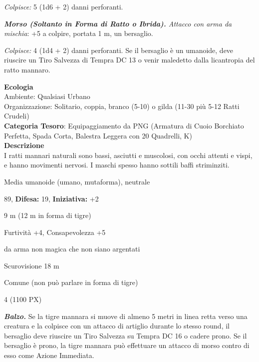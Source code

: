 \begin{multicols}{2}
{\emph{Colpisce:} 5 (1d6 + 2) danni perforanti.

\emph{\textbf{Morso (Soltanto in Forma di Ratto o Ibrida).} Attacco con arma da mischia}: +5 a colpire, portata 1 m, un bersaglio.

\emph{Colpisce:} 4 (1d4 + 2) danni perforanti. Se il bersaglio è un umanoide, deve riuscire un Tiro Salvezza di Tempra DC 13 o venir maledetto dalla licantropia del ratto mannaro.

\textbf{Ecologia}\\
Ambiente: Qualsiasi Urbano\\
Organizzazione: Solitario, coppia, branco (5-10) o gilda (11-30 più 5-12 Ratti Crudeli)\\
\textbf{Categoria Tesoro}: Equipaggiamento da PNG (Armatura di Cuoio Borchiato Perfetta, Spada Corta, Balestra Leggera con 20 Quadrelli, K)\\
\textbf{Descrizione}\\
I ratti mannari naturali sono bassi, asciutti e muscolosi, con occhi attenti e vispi, e hanno movimenti nervosi. I maschi spesso hanno sottili baffi striminziti.

\noindent
\begin{description}[noitemsep, topsep=0pt, parsep=0pt, partopsep=0pt, leftmargin=0cm, labelwidth=2.2cm]
	\item[\textbf{Taglia/Tipo:}] Media umanoide (umano, mutaforma), neutrale
	\item[\textbf{Caratt.:}] 
	\item[\textbf{Punti Ferita:}] 89,  \textbf{Difesa:} 19,  \textbf{Iniziativa:} +2
	\item[\textbf{Movimento:}] 9 m (12 m in forma di tigre)
	\item[\textbf{Tiri Salvez.:}] 
	\item[\textbf{Comp.:}] Furtività +4, Consapevolezza +5
	\item[\textbf{Imm. Danni:}] da arma non magica che non siano argentati
	\item[\textbf{Sensi:}] Scurovisione 18 m
	\item[\textbf{Linguaggi:}] Comune (non può parlare in forma di tigre)
	\item[\textbf{Sfida:}] 4 (1100 PX)\smallskip
\end{description}

\emph{\textbf{Balzo.}} Se la tigre mannara si muove di almeno 5 metri in linea retta verso una creatura e la colpisce con un attacco di artiglio durante lo stesso round, il bersaglio deve riuscire un Tiro Salvezza su Tempra DC 16 o cadere prono. Se il bersaglio è prono, la tigre mannara può effettuare un attacco di morso contro di esso come Azione Immediata.

}
\end{multicols}

